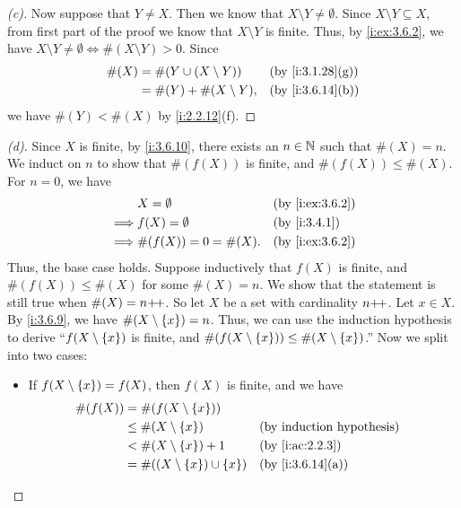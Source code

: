 \begin{proof}[(c)]
  Now suppose that \(Y \neq X\).
  Then we know that \(X \setminus Y \neq \emptyset\).
  Since \(X \setminus Y \subseteq X\), from first part of the proof we know that \(X \setminus Y\) is finite.
  Thus, by \cref{i:ex:3.6.2}, we have \(X \setminus Y \neq \emptyset \iff \#(X \setminus Y) > 0\).
  Since
  \begin{align*}
    \#(X) & = \#(Y \cup (X \setminus Y)) &  & \by{i:3.1.28}[g] \\
          & = \#(Y) + \#(X \setminus Y), &  & \by{i:3.6.14}[b]
  \end{align*}
  we have \(\#(Y) < \#(X)\) by \cref{i:2.2.12}(f).
\end{proof}

\begin{proof}[(d)]
  Since \(X\) is finite, by \cref{i:3.6.10}, there exists an \(n \in \mathbb{N}\) such that \(\#(X) = n\).
  We induct on \(n\) to show that \(\#(f(X))\) is finite, and \(\#(f(X)) \leq \#(X)\).
  For \(n = 0\), we have
  \begin{align*}
             & X = \emptyset         &  & \by{i:ex:3.6.2} \\
    \implies & f(X) = \emptyset      &  & \by{i:3.4.1}    \\
    \implies & \#(f(X)) = 0 = \#(X). &  & \by{i:ex:3.6.2}
  \end{align*}
  Thus, the base case holds.
  Suppose inductively that \(f(X)\) is finite, and \(\#(f(X)) \leq \#(X)\) for some \(\#(X) = n\).
  We show that the statement is still true when \(\#(X) = n{+}\!{+}\).
  So let \(X\) be a set with cardinality \(n{+}\!{+}\).
  Let \(x \in X\).
  By \cref{i:3.6.9}, we have \(\#(X \setminus \left\lbrace x\right\rbrace) = n\).
  Thus, we can use the induction hypothesis to derive ``\(f(X \setminus \left\lbrace x\right\rbrace)\) is finite, and \(\#(f(X \setminus \left\lbrace x\right\rbrace)) \leq \#(X \setminus \left\lbrace x\right\rbrace)\).''
  Now we split into two cases:
  \begin{itemize}
    \item If \(f(X \setminus \left\lbrace x\right\rbrace) = f(X)\), then \(f(X)\) is finite, and we have
          \begin{align*}
            \#(f(X)) & = \#(f(X \setminus \set{x}))                                   \\
                     & \leq \#(X \setminus \set{x})             &  & \byIH            \\
                     & < \#(X \setminus \set{x}) + 1            &  & \by{i:ac:2.2.3}  \\
                     & = \#((X \setminus \set{x}) \cup \set{x}) &  & \by{i:3.6.14}[a] \\

\end{align*}
\end{itemize}
\end{proof}
